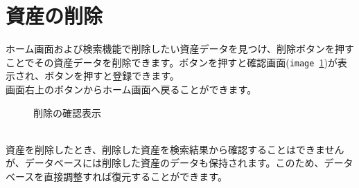 \documentclass[11ptm]{jsarticle}
\begin{document}
\clearpage
\section{資産の削除}
\label{sec:資産の削除}
ホーム画面および検索機能で削除したい資産データを見つけ、削除ボタンを押すことでその資産データを削除できます。ボタンを押すと確認画面({\tt image}\ \ref{fig:削除の確認表示})が表示され、ボタンを押すと登録できます。\\
画面右上のボタンからホーム画面へ戻ることができます。
\begin{figure}[h]
  \centering
  \caption{\label{fig:削除の確認表示}削除の確認表示}
\end{figure}\\
資産を削除したとき、削除した資産を検索結果から確認することはできませんが、データベースには削除した資産のデータも保持されます。このため、データベースを直接調整すれば復元することができます。

\end{document}
